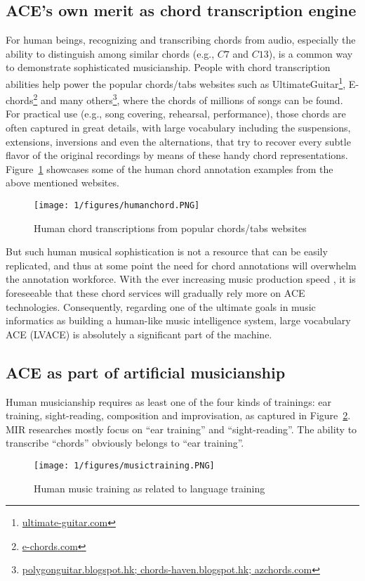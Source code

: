 \subsection{ACE's own merit as chord transcription engine}
For human beings, recognizing and transcribing chords from audio, especially the ability to distinguish among similar chords (e.g., $C7$ and $C13$), is a common way to demonstrate sophisticated musicianship. People with chord transcription abilities help power the popular chords/tabs websites such as UltimateGuitar\footnote{\url{ultimate-guitar.com}}, E-chords\footnote{\url{e-chords.com}} and many others\footnote{\url{polygonguitar.blogspot.hk; chords-haven.blogspot.hk; azchords.com}}, where the chords of millions of songs can be found. For practical use (e.g., song covering, rehearsal, performance), those chords are often captured in great details, with large vocabulary including the suspensions, extensions, inversions and even the alternations, that try to recover every subtle flavor of the original recordings by means of these handy chord representations. Figure~\ref{fig:1-humanchord} showcases some of the human chord annotation examples from the above mentioned websites.
\begin{figure}
\centering
\texttt{[image: 1/figures/humanchord.PNG]}
\caption{Human chord transcriptions from popular chords/tabs websites}
\label{fig:1-humanchord}
\end{figure}

But such human musical sophistication is not a resource that can be easily replicated, and thus at some point the need for chord annotations will overwhelm the annotation workforce. With the ever increasing music production speed \cite{globalmusicreport}, it is foreseeable that these chord services will gradually rely more on ACE technologies. Consequently, regarding one of the ultimate goals in music informatics as building a human-like music intelligence system, large vocabulary ACE (LVACE) is absolutely a significant part of the machine.

\subsection{ACE as part of artificial musicianship}
Human musicianship requires as least one of the four kinds of trainings: ear training, sight-reading, composition and improvisation, as captured in Figure~\ref{fig:1-musictraining}. MIR researches mostly focus on ``ear training'' and ``sight-reading''. The ability to transcribe ``chords'' obviously belongs to ``ear training''.
\begin{figure}
\centering
\texttt{[image: 1/figures/musictraining.PNG]}
\caption{Human music training as related to language training}
\label{fig:1-musictraining}
\end{figure}


